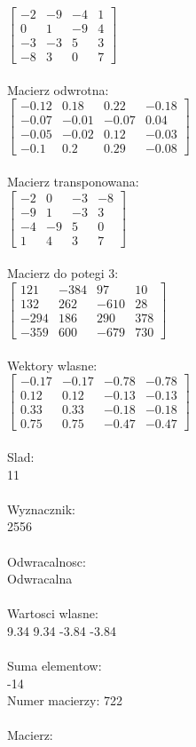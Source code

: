 \documentclass[a4paper,12pt]{article}
\begin{document}
$\begin{bmatrix} -2&-9&-4&1\\0&1&-9&4\\-3&-3&5&3\\-8&3&0&7 \end{bmatrix}$
\\
\\
Macierz odwrotna:\\

$\begin{bmatrix} -0.12&0.18&0.22&-0.18\\-0.07&-0.01&-0.07&0.04\\-0.05&-0.02&0.12&-0.03\\-0.1&0.2&0.29&-0.08 \end{bmatrix}$
\\
\\
Macierz transponowana:\\

$\begin{bmatrix} -2&0&-3&-8\\-9&1&-3&3\\-4&-9&5&0\\1&4&3&7 \end{bmatrix}$
\\
\\
Macierz do potegi 3:\\

$\begin{bmatrix} 121&-384&97&10\\132&262&-610&28\\-294&186&290&378\\-359&600&-679&730 \end{bmatrix}$
\\
\\
Wektory wlasne:\\

$\begin{bmatrix} -0.17&-0.17&-0.78&-0.78\\0.12&0.12&-0.13&-0.13\\0.33&0.33&-0.18&-0.18\\0.75&0.75&-0.47&-0.47 \end{bmatrix}$
\\
\\
Slad:\\
11
\\
\\
Wyznacznik:\\
2556
\\
\\
Odwracalnosc:\\
Odwracalna
\\
\\
Wartosci wlasne:\\
9.34 9.34 -3.84 -3.84
\\
\\
Suma elementow:\\
-14
\\
\newpage
Numer macierzy:
722
\\
\\
Macierz:\\
\end{document}
